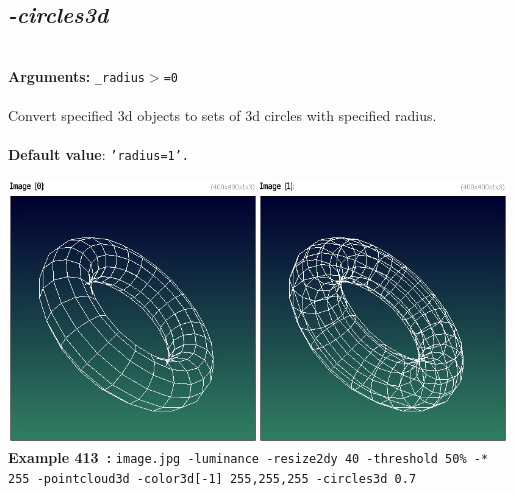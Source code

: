 \documentclass[a4paper,11pt,twoside]{book}
\begin{document}
\subsection{\emph{-circles3d} }\vspace*{-0.5em}
~\\\textbf{Arguments: } 
{\small \texttt{\_radius$>$=0}}\\~\\
Convert specified 3d objects to sets of 3d circles with specified radius.
~\\~\\\textbf{Default value}: {\small \texttt{'radius=1'.}}
\begin{center}\includegraphics[keepaspectratio=true,height=7cm,width=\textwidth]{img/gmic_def413.jpg}\\
{\footnotesize \textbf{Example 413~:} \texttt{image.jpg -luminance -resize2dy 40 -threshold 50\% -* 255 -pointcloud3d -color3d[-1] 255,255,255 -circles3d 0.7}}
\end{center}
\end{document}
